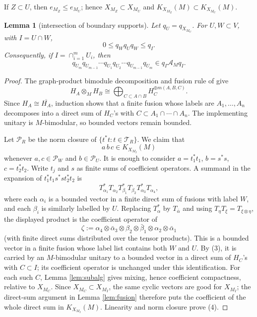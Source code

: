 \documentclass[12pt]{article}
\newtheorem{lemma}{Lemma}
\newcommand{\cA}{\mathcal A}
\newcommand{\cT}{\mathcal T}
\begin{document}
If \(Z\subset U\), then \(e_{M_Z}\le e_{M_U}\); hence
\(X_{M_Z}\subset X_{M_U}\) and \(K_{X_{M_Z}}(M)\subset K_{X_{M_U}}(M)\).

\begin{lemma}[intersection of boundary supports]\label{lem:intersection}
Let \(q_U=q_{X_{M_U}}\).  For \(U,W\subset V\), with \(I=U\cap W\),
\[
        0\le q_Wq_Uq_W\le q_I .
\]
Consequently, if \(I=\cap_{i=1}^m U_i\), then
\[
q_{U_m}q_{U_{m-1}}\cdots q_{U_1}q_{U_2}\cdots q_{U_{m-1}}q_{U_m}
   \in q_I\cA_Mq_I .
\]
\end{lemma}

\begin{proof}
The graph-product bimodule decomposition and fusion rule of
\cite[Theorem 5.4 and Proposition 5.5]{CDHJKN} give
\[
        H_A\otimes_M H_B\cong
        \bigoplus_{C\subset A\cap B}H_C^{\oplus m(A,B,C)} .        \tag{3}
\]
Since \(H_A\cong\overline{H_A}\), induction shows that a finite fusion whose
labels are \(A_1,\ldots,A_n\) decomposes into a direct sum of \(H_C\)'s with
\(C\subset A_1\cap\cdots\cap A_n\).  The implementing unitary is
\(M\)-bimodular, so bounded vectors remain bounded.

Let \(\mathcal P_R\) be the norm closure of \(\{t^*t:t\in\cT_R\}\).  We claim
that
\[
        a\,b\,c\in K_{X_{M_I}}(M)             \tag{4}
\]
whenever \(a,c\in\mathcal P_W\) and \(b\in\mathcal P_U\).  It is enough to
consider \(a=t_1^*t_1\), \(b=s^*s\), \(c=t_2^*t_2\).  Write
\(t_j\) and \(s\) as finite sums of coefficient operators.  A summand in the
expansion of \(t_1^*t_1s^*st_2^*t_2\) is
\[
T_{\alpha_1}^*T_{\alpha_2}T_{\beta_1}^*T_{\beta_2}
T_{\alpha_3}^*T_{\alpha_4},
\]
where each \(\alpha_i\) is a bounded vector in a finite direct sum of fusions
with label \(W\), and each \(\beta_i\) is similarly labelled by \(U\).  Replacing
\(T_\alpha^*\) by \(T_{\bar\alpha}\) and using
\(T_\eta T_\xi=T_{\xi\otimes\eta}\), the displayed product is the coefficient
operator of
\[
 \zeta:=\alpha_4\otimes\bar\alpha_3\otimes\beta_2\otimes\bar\beta_1
 \otimes\alpha_2\otimes\bar\alpha_1
\]
(with finite direct sums distributed over the tensor products).  This is a
bounded vector in a finite fusion whose label list contains both \(W\) and
\(U\).  By (3), it is carried by an \(M\)-bimodular unitary to a bounded vector
in a direct sum of \(H_C\)'s with \(C\subset I\); its coefficient operator is
unchanged under this identification.  For each such \(C\), Lemma
\ref{lem:subalg} gives mixing, hence coefficient compactness, relative to
\(X_{M_C}\).  Since \(X_{M_C}\subset X_{M_I}\), the same cyclic vectors are good
for \(X_{M_I}\); the direct-sum argument in Lemma \ref{lem:fusion} therefore
puts the coefficient of the whole direct sum in \(K_{X_{M_I}}(M)\).  Linearity
and norm closure prove (4).


\end{proof}
\end{document}

